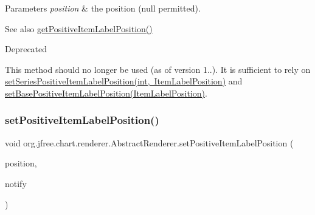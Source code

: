 \begin{DoxyParams}{Parameters}
{\em position} & the position ({\ttfamily null} permitted).\\
\hline
\end{DoxyParams}
\begin{DoxySeeAlso}{See also}
\mbox{\hyperlink{classorg_1_1jfree_1_1chart_1_1renderer_1_1_abstract_renderer_a2a9b96ccec98379882ae3c8a24e09261}{get\+Positive\+Item\+Label\+Position()}}
\end{DoxySeeAlso}
\begin{DoxyRefDesc}{Deprecated}
\item[\mbox{\hyperlink{deprecated__deprecated000138}{Deprecated}}]This method should no longer be used (as of version 1..). It is sufficient to rely on \mbox{\hyperlink{classorg_1_1jfree_1_1chart_1_1renderer_1_1_abstract_renderer_afaf8ae06e544670e0ca1247dc965054b}{set\+Series\+Positive\+Item\+Label\+Position(int, Item\+Label\+Position)}} and \mbox{\hyperlink{classorg_1_1jfree_1_1chart_1_1renderer_1_1_abstract_renderer_aef3b9adf36f2b4e30112230e960ec5d7}{set\+Base\+Positive\+Item\+Label\+Position(\+Item\+Label\+Position)}}. \end{DoxyRefDesc}
\mbox{\label{classorg_1_1jfree_1_1chart_1_1renderer_1_1_abstract_renderer_ada1e521fa006a9718e401eba342ea910}} 
\subsubsection{\texorpdfstring{set\+Positive\+Item\+Label\+Position()}{setPositiveItemLabelPosition()}\hspace{0.1cm}{\footnotesize\ttfamily [2/2]}}
{\footnotesize\ttfamily void org.\+jfree.\+chart.\+renderer.\+Abstract\+Renderer.\+set\+Positive\+Item\+Label\+Position (\begin{DoxyParamCaption}\item[{\mbox{\hyperlink{classorg_1_1jfree_1_1chart_1_1labels_1_1_item_label_position}{Item\+Label\+Position}}}]{position,  }\item[{boolean}]{notify }\end{DoxyParamCaption})}

